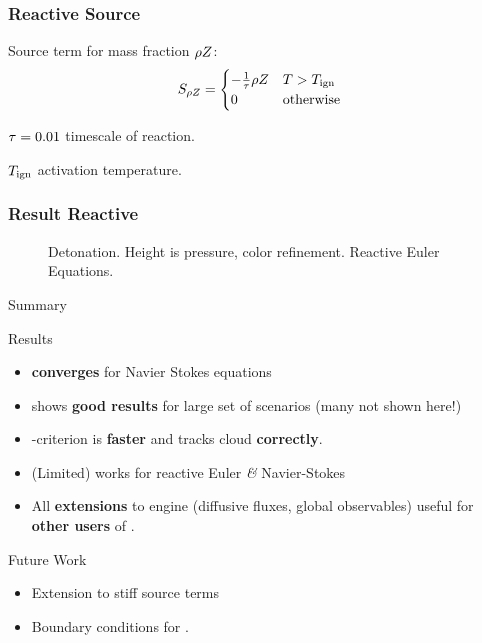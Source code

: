 \documentclass[aspectratio=169]{beamer}
\begin{document}
\begin{frame}\frametitle{Reactive Source}
Source term for mass fraction $\rho Z$:  
 \begin{equation}\label{eq:source-reaction}
  \source[\QZ] =\begin{cases}
  - \frac{1}{\reactionTimescale} \QZ  & T > \reactionTemperature\\
  0 & \text{otherwise}
\end{cases}  
\end{equation}

$\tau = 0.01$ timescale of reaction.

$T_{\text{ign}}$ activation temperature.
\end{frame}

\begin{frame}
  \frametitle{Result Reactive}
   \begin{figure}[h]
    \centering
    \caption{Detonation. Height is pressure, color refinement.
    Reactive Euler Equations.}
  \end{figure}
\end{frame}

\begin{frame}{Summary}
  \begin{block}{Results}
  \begin{itemize}
  \item \aderdg{} \textbf{converges} for Navier Stokes equations
  \item \aderdg{} shows \textbf{good results} for large set of scenarios (many not shown here!)
  \item \amr{}-criterion is \textbf{faster} and tracks cloud \textbf{correctly}.
  \item (Limited) \aderdg{} works for reactive Euler \textit{\&} Navier-Stokes
  \item All \textbf{extensions} to engine (diffusive fluxes, global observables) useful for \textbf{other users} of \exahype{}.
  \end{itemize}
  \end{block}

  \begin{block}{Future Work}
    \begin{itemize}
    \item Extension to stiff source terms
    \item Boundary conditions for \muscl{}.  
    \end{itemize}

  \end{block}
\end{frame}
\end{document}
